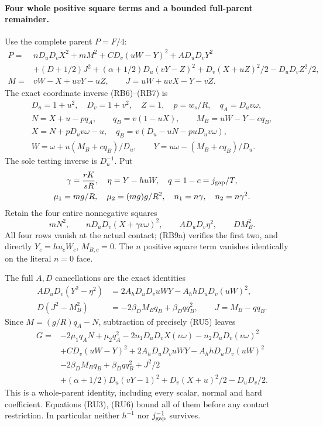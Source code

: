 \paragraph{Four whole positive square terms and a bounded full-parent remainder.}
Use the complete parent $P=F/4$:
\[
\begin{aligned}
 P={}&nD_uD_vX^2+mM^2+CD_v(uW-Y)^2+AD_uD_vY^2\\
 &+(D+1/2)J^2+(\alpha+1/2)D_u(vY-Z)^2
                   +D_v(X+uZ)^2/2-D_uD_vZ^2/2,\\
 M={}&vW-X+uvY-uZ,\qquad J=uW+uvX-Y-vZ.
\end{aligned}
\]
The exact coordinate inverse (RB6)--(RB7) is
\[
\begin{gathered}
 D_u=1+u^2,\quad D_v=1+v^2,\quad Z=1,\quad
 p=w_s/R,\quad q_A=D_uv\omega,\\
 N=X+u-pq_A,\qquad q_B=v(1-uX),\qquad M_B=uW-Y-cq_B,\\
 X=N+pD_uv\omega-u,\quad q_B=v(D_u-uN-puD_uv\omega),\\
 W=\omega+u(M_B+cq_B)/D_u,\qquad
 Y=u\omega-(M_B+cq_B)/D_u.
\end{gathered}                                                     \tag{RU4}
\]
The sole testing inverse is $D_u^{-1}$. Put
\[
 \begin{gathered}
 \gamma=\frac{rK}{sR},\quad \eta=Y-huW,\quad q=1-c=j_{\rm gap}/T,\\
 \mu_1=mg/R,\quad \mu_2=(mg)g/R^2,\quad n_1=n\gamma,\quad n_2=n\gamma^2.
 \end{gathered}
\]
Retain the four entire nonnegative squares
\[
 mN^2,\qquad nD_uD_v(X+\gamma v\omega)^2,
 \qquad AD_uD_v\eta^2,\qquad DM_B^2.
 \tag{RU5}
\]
All four rows vanish at the actual contact; (RB9a) verifies the first
two, and directly $Y_c=hu_cW_c$, $M_{B,c}=0$.
The $n$ positive square term vanishes identically on the literal $n=0$ face.

The full $A,D$ cancellations are the exact identities
\[
\begin{aligned}
 AD_uD_v(Y^2-\eta^2)&=2A_hD_uD_vuWY-A_hhD_uD_v(uW)^2,\\
 D(J^2-M_B^2)&=-2\beta_DM_Bq_B+\beta_Dq q_B^2,
 \qquad J=M_B-q q_B.
\end{aligned}                                                     \tag{RU6}
\]
Since $M=(g/R)q_A-N$, subtraction of precisely (RU5) leaves
\[
\begin{aligned}
 G={}&-2\mu_1q_AN+\mu_2q_A^2
       -2n_1D_uD_vX(v\omega)-n_2D_uD_v(v\omega)^2\\
    &+CD_v(uW-Y)^2+2A_hD_uD_vuWY-A_hhD_uD_v(uW)^2\\
    &-2\beta_DM_Bq_B+\beta_Dq q_B^2+J^2/2\\
    &+(\alpha+1/2)D_u(vY-1)^2+D_v(X+u)^2/2-D_uD_v/2.
\end{aligned}                                                     \tag{RU7}
\]
This is a whole-parent identity, including every scalar, normal and
hard coefficient. Equations (RU3), (RU6) bound all of them before
any contact restriction. In particular neither $h^{-1}$ nor
$j_{\rm gap}^{-1}$ survives.

